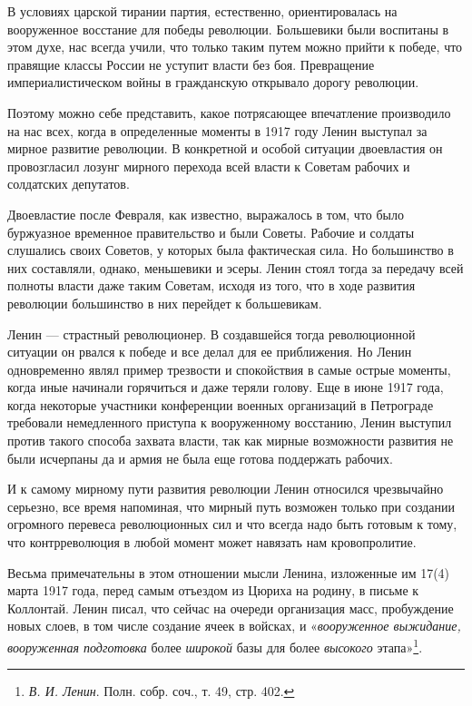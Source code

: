 \documentclass[12pt, a4paper, openany]{book}
\begin{document}
В условиях царской тирании партия, естественно, ориентировалась на вооруженное восстание для победы революции. Большевики были воспитаны в этом духе, нас всегда учили, что только таким путем можно прийти к победе, что правящие классы России не уступит власти без боя. Превращение империалистическом войны в гражданскую открывало дорогу революции.

Поэтому можно себе представить, какое потрясающее впечатление производило на нас всех, когда в определенные моменты в 1917 году Ленин выступал за мирное развитие революции. В конкретной и особой ситуации двоевластия он провозгласил лозунг мирного перехода всей власти к Советам рабочих и солдатских депутатов.

Двоевластие после Февраля, как известно, выражалось в том, что было буржуазное временное правительство и были Советы. Рабочие и солдаты слушались своих Советов, у которых была фактическая сила. Но большинство в них составляли, однако, меньшевики и эсеры. Ленин стоял тогда за передачу всей полноты власти даже таким Советам, исходя из того, что в ходе развития революции большинство в них перейдет к большевикам.

Ленин — страстный революционер. В создавшейся тогда революционной ситуации он рвался к победе и все делал для ее приближения. Но Ленин одновременно являл пример трезвости и спокойствия в самые острые моменты, когда иные начинали горячиться и даже теряли голову. Еще в июне 1917 года, когда некоторые участники конференции военных организаций в Петрограде требовали немедленного приступа к вооруженному восстанию, Ленин выступил против такого способа захвата власти, так как мирные возможности развития не были исчерпаны да и армия не была еще готова поддержать рабочих.

И к самому мирному пути развития революции Ленин относился чрезвычайно серьезно, все время напоминая, что мирный путь возможен только при создании огромного перевеса революционных сил и что всегда надо быть готовым к тому, что контрреволюция в любой момент может навязать нам кровопролитие.

Весьма примечательны в этом отношении мысли Ленина, изложенные им 17(4) марта 1917 года, перед самым отъездом из Цюриха на родину, в письме к Коллонтай. Ленин писал, что сейчас на очереди организация масс, пробуждение новых слоев, в том числе создание ячеек в войсках, и «\textit{вооруженное выжидание, вооруженная подготовка} более \textit{широкой} базы для более \textit{высокого} этапа»\footnote{\textit{В. И. Ленин}. Полн. собр. соч., т. 49, стр. 402.}.
\end{document}
